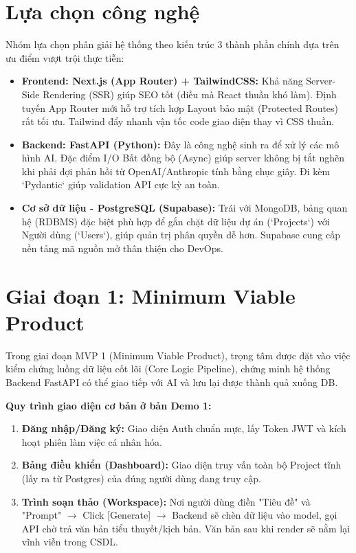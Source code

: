 \documentclass[final]{hcmuitthesis}
\begin{document}
\section{Lựa chọn công nghệ}
Nhóm lựa chọn phân giải hệ thống theo kiến trúc 3 thành phần chính dựa trên ưu điểm vượt trội thực tiễn:
\begin{itemize}
    \item \textbf{Frontend: Next.js (App Router) + TailwindCSS:} Khả năng Server-Side Rendering (SSR) giúp SEO tốt (điều mà React thuần khó làm). Định tuyến App Router mới hỗ trợ tích hợp Layout bảo mật (Protected Routes) rất tối ưu. Tailwind đẩy nhanh vận tốc code giao diện thay vì CSS thuần.
    \item \textbf{Backend: FastAPI (Python):} Đây là công nghệ sinh ra để xử lý các mô hình AI. Đặc điểm I/O Bất đồng bộ (Async) giúp server không bị tắt nghẽn khi phải đợi phản hồi từ OpenAI/Anthropic tính bằng chục giây. Đi kèm `Pydantic` giúp validation API cực kỳ an toàn.
    \item \textbf{Cơ sở dữ liệu - PostgreSQL (Supabase):} Trái với MongoDB, bảng quan hệ (RDBMS) đặc biệt phù hợp để gắn chặt dữ liệu dự án (`Projects`) với Người dùng (`Users`), giúp quản trị phân quyền dễ hơn. Supabase cung cấp nền tảng mã nguồn mở thân thiện cho DevOps.
\end{itemize}

\section{Giai đoạn 1: Minimum Viable Product}
Trong giai đoạn MVP 1 (Minimum Viable Product), trọng tâm được đặt vào việc kiểm chứng luồng dữ liệu cốt lõi (Core Logic Pipeline), chứng minh hệ thống Backend FastAPI có thể giao tiếp với AI và lưu lại được thành quả xuống DB.

\textbf{Quy trình giao diện cơ bản ở bản Demo 1:}
\begin{enumerate}
    \item \textbf{Đăng nhập/Đăng ký:} Giao diện Auth chuẩn mực, lấy Token JWT và kích hoạt phiên làm việc cá nhân hóa.
    \item \textbf{Bảng điều khiển (Dashboard):} Giao diện truy vấn toàn bộ Project tĩnh (lấy ra từ Postgres) của đúng người dùng đang truy cập.
    \item \textbf{Trình soạn thảo (Workspace):} Nơi người dùng điền "Tiêu đề" và "Prompt" $\rightarrow$ Click [Generate] $\rightarrow$ Backend sẽ chèn dữ liệu vào model, gọi API chờ trả văn bản tiểu thuyết/kịch bản. Văn bản sau khi render sẽ nằm lại vĩnh viễn trong CSDL.
\end{enumerate}
\end{document}
